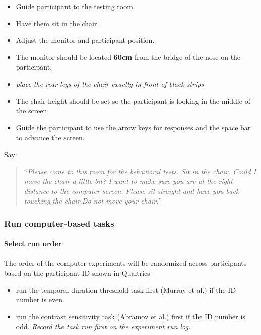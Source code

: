 \documentclass[]{article}
\providecommand{\tightlist}{%
  \setlength{\itemsep}{0pt}\setlength{\parskip}{0pt}}
\let\oldparagraph\paragraph
\renewcommand{\paragraph}[1]{\oldparagraph{#1}\mbox{}}
\begin{document}
\begin{itemize}
\tightlist
\item
  Guide participant to the testing room.
\item
  Have them sit in the chair.
\item
  Adjust the monitor and participant position.
\item
  The monitor should be located \textbf{60cm} from the bridge of the
  nose on the participant.
\item
  \emph{place the rear legs of the chair exactly in front of black
  strips}
\item
  The chair height should be set so the participant is looking in the
  middle of the screen.
\item
  Guide the participant to use the arrow keys for responses and the
  space bar to advance the screen.
\end{itemize}

Say:

\begin{quote}
``\emph{Please come to this room for the behavioral tests. Sit in the
chair. Could I move the chair a little bit? I want to make sure you are
at the right distance to the computer screen. Please sit straight and
have you back touching the chair.Do not move your chair.}''
\end{quote}

\subsubsection{Run computer-based tasks}\label{run-computer-based-tasks}

\paragraph{Select run order}\label{select-run-order}

The order of the computer experiments will be randomized across
participants based on the participant ID shown in Qualtrics

\begin{itemize}
\tightlist
\item
  run the temporal duration threshold task first (Murray et al.) if the
  ID number is even.
\item
  run the contrast sensitivity task (Abramov et al.) first if the ID
  number is odd. \emph{Record the task run first on the experiment run
  log.}
\end{itemize}
\end{document}
